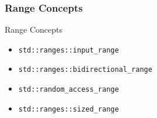 \subsubsection{Range Concepts}

\begin{frame}[fragile]{Range Concepts}
    \begin{itemize}
        \item<1-> \texttt{std::ranges::input_range}
        \item<2-> \texttt{std::ranges::bidirectional_range}
        \item<3-> \texttt{std::random_access_range}
        \item<4-> \texttt{std::ranges::sized_range}
    \end{itemize}
\end{frame}

